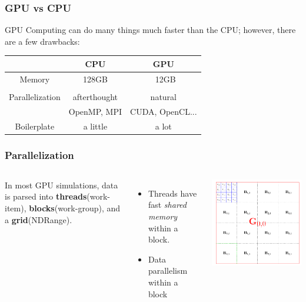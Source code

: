 \documentclass{beamer}
\begin{document}
\begin{frame}
\frametitle{GPU vs CPU}
GPU Computing can do many things much faster than the CPU; however, there are a few drawbacks:
\begin{center}
\begin{tabular}{c | c | c}
& CPU & GPU \\
\hline
Memory & 128GB & ~12GB \\
& & \\
Parallelization & afterthought & natural \\
& OpenMP, MPI & CUDA, OpenCL...\\
Boilerplate & a little & a lot\\

\end{tabular}
\end{center}
\end{frame}

\begin{frame}
\frametitle{Parallelization}
\begin{columns}
In most GPU simulations, data is parsed into \textbf{threads}(work-item), \textbf{blocks}(work-group), and a \textbf{grid}(NDRange).
\begin{itemize}
\item Threads have fast \textit{shared memory} within a block.
\item Data parallelism within a block
\end{itemize} 
\begin{center}
\includegraphics[width=\textwidth]{GBT.png}
\end{center}
\end{columns}
\end{frame}
\end{document}
